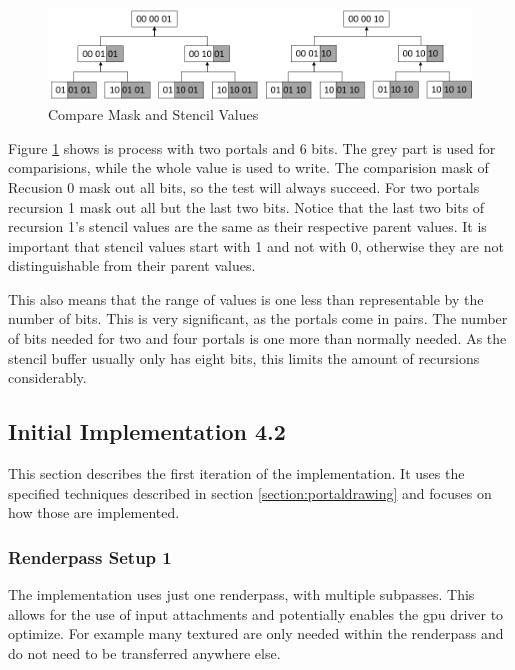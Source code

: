 \begin{figure}[h]
	\includegraphics[width=\linewidth]{images/stencilvalues2.png}
	\caption{Compare Mask and Stencil Values}
	\label{fig:stencilvalues}
\end{figure}

Figure \ref{fig:stencilvalues} shows is process with two portals and 6 bits. The grey part is used for comparisions, while the whole value is used to write. The comparision mask of Recusion 0 mask out all bits, so the test will always succeed. For two portals recursion 1 mask out all but the last two bits. Notice that the last two bits of  recursion 1's stencil values are the same as their respective parent values. It is important that stencil values start with 1 and not with 0, otherwise they are not distinguishable from their parent values.

This also means that the range of values is one less than representable by the number of bits. This is very significant, as the portals come in pairs. The number of bits needed for two and four portals is one more than normally needed. As the stencil buffer usually only has eight bits, this limits the amount of recursions considerably.



\subsection{Initial Implementation 4.2}
\label{section:intialimplementation}
This section describes the first iteration of the implementation. It uses the specified techniques described in section \ref{section:portaldrawing} and focuses on how those are implemented.


\subsubsection{Renderpass Setup 1}
\label{section:renderpass}

The implementation uses just one renderpass, with multiple subpasses. This allows for the use of input attachments and potentially enables the \gls{gpu} driver to optimize. For example many textured are only needed within the renderpass and do not need to be transferred anywhere else.

